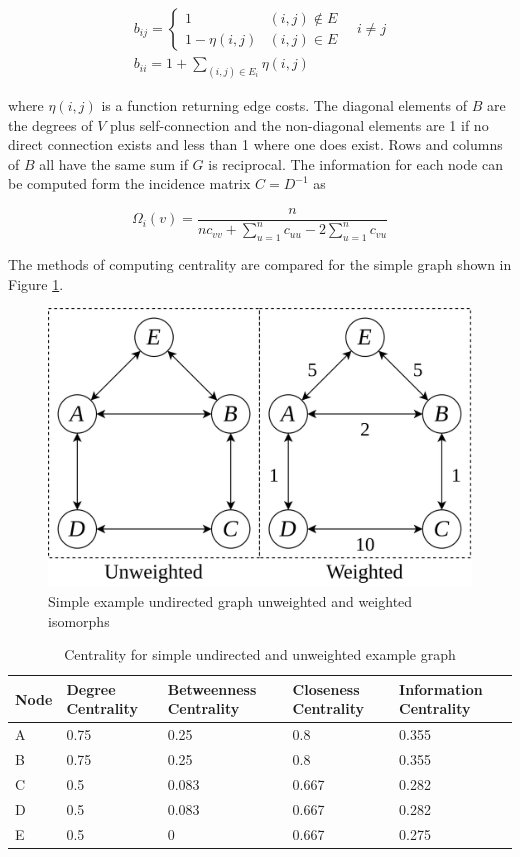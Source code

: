 \begin{align}
	b_{ij} = \begin{cases}
		1 & (i, j) \not\in E \\
		1 - \eta(i, j) & (i, j) \in E
	\end{cases}\quad i\neq j \\
	b_{ii} = 1 + \sum_{(i, j) \in E_i} \eta(i, j)
\end{align}

where $\eta(i, j)$ is a function returning edge costs. The diagonal elements of $B$ are the degrees of $V$ plus self-connection and the non-diagonal elements are 1 if no direct connection exists and less than 1 where one does exist. Rows and columns of $B$ all have the same sum if $G$ is reciprocal. The information for each node can be computed form the incidence matrix $C = D^{-1}$ as

\begin{equation}
	\Omega_i(v) = \frac{n}{nc_{vv} + \sum_{u = 1}^{n} c_{uu} - 2 \sum_{u = 1}^{n}c_{vu}}\label{eq:information_centrality}
\end{equation}

The methods of computing centrality are compared for the simple graph shown in Figure \ref{fig:simple_graph}.

\begin{figure}[H]
	\centering
	\includegraphics[width = .5\linewidth]{figs/simple_graph.png}
	\caption{Simple example undirected graph unweighted and weighted isomorphs}
	\label{fig:simple_graph}
\end{figure}

\begin{table}[H]
	\centering
	\caption{Centrality for simple undirected and unweighted example graph}
	\label{tab:unweighted_centrality}
	\begin{tabular}{|C{.2\linewidth}|C{.2\linewidth}|C{.2\linewidth}|C{.2\linewidth}|C{.2\linewidth}|}
		\hline Node & Degree Centrality & Betweenness Centrality & Closeness Centrality & Information Centrality \\
		\hline A & 0.75 & 0.25 & 0.8 & 0.355 \\
		\hline B & 0.75 & 0.25 & 0.8 & 0.355 \\
		\hline C & 0.5 & 0.083 & 0.667 & 0.282 \\
		\hline D & 0.5 & 0.083 & 0.667 & 0.282 \\
		\hline E & 0.5 & 0 & 0.667 & 0.275 \\
		\hline
	\end{tabular}
\end{table}

